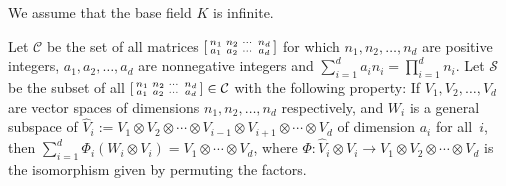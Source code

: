 \documentclass[10pt,a4paper]{article}
\theoremstyle{definition}
\theoremstyle{remark}
\begin{document}
\newcommand{\B}{{\mathcal B}}
\newcommand{\C}{{\mathbb C}}
\newcommand{\N}{{\mathbb N}}
\newcommand{\F}{{\mathbb F}}
\newcommand{\Q}{{\mathbb Q}}
\newcommand{\Z}{{\mathbb Z}}
\newcommand{\tnr}{\operatorname{Tr}}
\newcommand{\tnrace}{\operatorname{Tr}}
%
%
\newcommand{\SL}{\operatorname{SL}}
\newcommand{\Mod}{\operatorname{mod}}

\newcommand{\VV}{{\mathbb V}}

\newcommand{\nullcone}{\mathcal{N}}
%
%
\newcommand{\Sym}{S}

\newcommand{\rk} {\operatorname{rk}}
\newcommand{\g} {\mathfrak{g}}
\newcommand{\n} {\mathfrak{n}}
\newcommand{\h} {\mathfrak{h}}
\newcommand{\tn}{\mathfrak{t}}
\newcommand{\sln}{\mathfrak{sl}_n}
\newcommand{\adaptable} {adaptable}
\newcommand{\End}{{\rm End}}
\newcommand{\U}{\operatorname{U}}
\newcommand{\SU}{\operatorname{SU}}
\newcommand{\ad}{\rm ad}
\newcommand{\uncramped} {uncramped}
\newcommand{\Supp} {{\rm Supp}}
\newcommand{\wt}{\widetilde}
\newcommand{\isom} {\stackrel{\sim}{\longrightarrow}}
 \newcommand{\sslash}{\mathbin{\mkern-4mu/\mkern-6mu/\mkern-4mu}}
%
 \newcommand{\CC}{{\mathcal C}}
\newcommand{\SSS}{{\mathcal S}}


%
%
%




\newcommand{\comm}[1]{\textcolor{red}{$\clubsuit${\it #1}$\clubsuit$}}


%
%
%
%
%


%

We assume that the base field $K$ is infinite. 

Let $\CC$ be the set of all matrices $\begin{bsmallmatrix} n_1 & n_2 & \cdots & n_d\\a_1 & a_2  & \cdots & a_d\end{bsmallmatrix}$  for which  $n_1,n_2,\dots,n_d$ are positive integers, $a_1,a_2,\dots,a_d$ are nonnegative integers
and $\sum_{i=1}^d a_i n_i=\prod_{i=1}^d n_i$. Let $\SSS$ be the subset of all  $\begin{bsmallmatrix} n_1 & n_2 & \cdots & n_d\\a_1 & a_2  & \cdots & a_d\end{bsmallmatrix}\in {\CC}$ with the following property:
If $V_1,V_2,\dots,V_d$ are vector spaces of dimensions $n_1,n_2,\dots,n_d$ respectively, and $W_i$ is a general subspace
of $\widehat{V}_i:=V_1\otimes V_2\otimes \cdots \otimes V_{i-1}\otimes V_{i+1}\otimes \cdots\otimes V_d$ of dimension $a_i$ for all~$i$,
then $\sum_{i=1}^d \Phi_i( W_i\otimes V_i) = V_1 \otimes \cdots \otimes V_d$, where $\Phi:\widehat{V}_i\otimes V_i\to V_1\otimes V_2\otimes \cdots \otimes  V_d$ is
the isomorphism given by permuting the factors.
\end{document}
